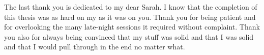 	The last thank you is dedicated to my dear Sarah. I know that the completion of this thesis was as hard on my as it was on you. Thank you for being patient and for overlooking the many late-night sessions it required without complaint. Thank you also for always being convinced that my stuff was solid and that I was solid and that I would pull through in the end no matter what.










	